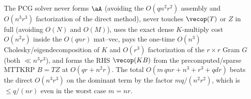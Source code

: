 \begin{remark}\label{rem:summary}
The PCG solver never forms $\aA$ (avoiding the $O(qn^{2}r^{2})$ assembly and
$O(n^{3}r^{3})$ factorization of the direct method), never touches $\vecop(T)$
or $Z$ in full (avoiding $O(N)$ and $O(M)$), uses the exact dense $K$-multiply
cost $O(n^{2}r)$ inside the $O(qnr)$ mat--vec, pays the one-time
$O(n^{3})$ Cholesky/eigendecomposition of $K$ and $O(r^{3})$ factorization of
the $r\times r$ Gram $G$ (both $\ll n^{3}r^{3}$), and forms the RHS
$\vecop(KB)$ from the precomputed/sparse MTTKRP $B=TZ$ at $O(qr+n^{2}r)$. The
total $O(m\,qnr+n^{3}+r^{3}+qdr)$ beats the direct $O(n^{3}r^{3})$ on the
dominant term by the factor $mq/(n^{2}r^{2})$, which is $\le q/(nr)$ even in the
worst case $m=nr$.
\end{remark}


